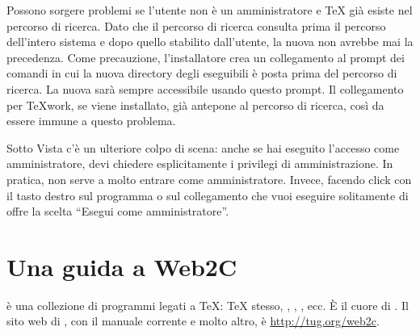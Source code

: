 \documentclass{article}
\begin{document}
Possono sorgere problemi se l'utente non è un amministratore e \TeX{} già
esiste nel percorso di ricerca. Dato che il percorso di ricerca consulta
prima il percorso dell'intero sistema e dopo quello stabilito dall'utente,
la nuova \TL{} non avrebbe mai la precedenza. Come precauzione,
l'installatore crea un collegamento al prompt dei comandi in cui la nuova
directory degli eseguibili è posta prima del percorso di ricerca. La nuova
\TL{} sarà sempre accessibile usando questo prompt. Il collegamento per
TeX{}work, se viene installato, già antepone \TL{} al percorso di ricerca,
così da essere immune a questo problema.

Sotto Vista c'è un ulteriore colpo di scena: anche se hai eseguito
l'accesso come amministratore, devi chiedere esplicitamente i privilegi di
amministrazione. In pratica, non serve a molto entrare come
amministratore. Invece, facendo click con il tasto destro sul programma o
sul collegamento che vuoi eseguire solitamente di offre la scelta ``Esegui
come amministratore''.

\section{Una guida a Web2C}

\Webc{} è una collezione di programmi legati a \TeX: \TeX{} stesso, \MF{},
\MP, \BibTeX{}, ecc. È il cuore di \TL{}. Il sito web di \Webc{}, con il
manuale corrente e molto altro, è \url{http://tug.org/web2c}.
\end{document}
